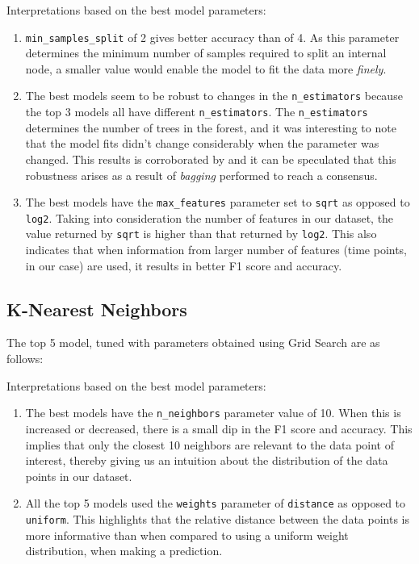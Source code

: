 \documentclass[11pt,a4paper]{article}
\newcommand{\noi}{\noindent}
\begin{document}
\noi
Interpretations based on the best model parameters:
\begin{enumerate}
	\itemsep0em
	\item \texttt{min\_samples\_split} of 2 gives better accuracy than of 4. As this parameter determines the minimum number of samples required to split an internal node, a smaller value would enable the model to fit the data more \textit{finely}.
	\item The best models seem to be robust to changes in the \texttt{n\_estimators} because the top 3 models all have different \texttt{n\_estimators}. The \texttt{n\_estimators} determines the number of trees in the forest, and it was interesting to note that the model fits didn't change considerably when the parameter was changed. This results is corroborated by \cite{cutler2012random} and it can be speculated that this robustness arises as a result of \textit{bagging} performed to reach a consensus.
	\item The best models have the \texttt{max\_features} parameter set to \texttt{sqrt} as opposed to \texttt{log2}. Taking into consideration the number of features in our dataset, the value returned by \texttt{sqrt} is higher than that returned by \texttt{log2}. This also indicates that when information from larger number of features (time points, in our case) are used, it results in better F1 score and accuracy.
\end{enumerate}


\subsection{K-Nearest Neighbors}
The top 5 model, tuned with parameters obtained using Grid Search are as follows:


\noi
Interpretations based on the best model parameters:
\begin{enumerate}
	\itemsep0em
	\item The best models have the \texttt{n\_neighbors} parameter value of 10. When this is increased or decreased, there is a small dip in the F1 score and accuracy. This implies that only the closest 10 neighbors are relevant to the data point of interest, thereby giving us an intuition about the distribution of the data points in our dataset.
	\item All the top 5 models used the \texttt{weights} parameter of \texttt{distance} as opposed to \texttt{uniform}. This highlights that the relative distance between the data points is more informative than when compared to using a uniform weight distribution, when making a prediction.
\end{enumerate}
\end{document}
